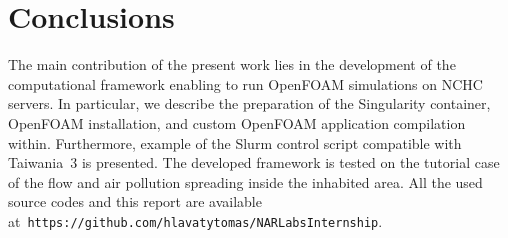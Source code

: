 \cleardoublepage
\section{Conclusions}
\label{sec:concl}

The main contribution of the present work lies in the development of the computational framework enabling to run OpenFOAM simulations on NCHC servers. In particular, we describe the preparation of the Singularity container, OpenFOAM installation, and custom OpenFOAM application compilation within. Furthermore, example of the Slurm control script compatible with Taiwania~3 is presented. The developed framework is tested on the tutorial case of the flow and air pollution spreading inside the inhabited area. All the used source codes and this report are available at~\texttt{https://github.com/hlavatytomas/NARLabsInternship}.